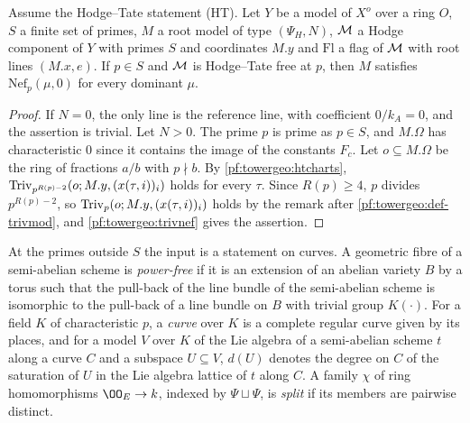 \begin{proposition}\label{pf:towergeo:rootw}
Assume the Hodge--Tate statement \textup{(HT)}. Let $Y$ be a model of $X^o$ over a ring $O$, $S$ a finite set of
primes, $M$ a root model of type $(\Psi_H,N)$, $\mathcal M$ a Hodge component of $Y$ with primes $S$ and
coordinates $M.y$ and $\mathrm{Fl}$ a flag of $\mathcal M$ with root lines $(M.x,e)$. If $p\in S$ and $\mathcal M$
is Hodge--Tate free at $p$, then $M$ satisfies $\mathrm{Nef}_p(\mu,0)$ for every dominant $\mu$.
\end{proposition}

\begin{proof}
If $N=0$, the only line is the reference line, with coefficient $0/k_A=0$, and the assertion is trivial. Let
$N>0$. The prime $p$ is prime as $p\in S$, and $M.\Omega$ has characteristic $0$ since it contains the image of the
constants $F_c$. Let $o\subseteq M.\Omega$ be the ring of fractions $a/b$ with $p\nmid b$. By
\cref{pf:towergeo:htcharts}, $\mathrm{Triv}_{p^{R(p)-2}}(o;M.y,(x(\tau,i))_i)$ holds for every $\tau$. Since
$R(p)\ge4$, $p$ divides $p^{R(p)-2}$, so $\mathrm{Triv}_p(o;M.y,(x(\tau,i))_i)$ holds by the remark after
\cref{pf:towergeo:def-trivmod}, and \cref{pf:towergeo:trivnef} gives the assertion.
\end{proof}

At the primes outside $S$ the input is a statement on curves. A geometric fibre of a semi-abelian scheme is
\emph{power-free} if it is an extension of an abelian variety $B$ by a torus such that the pull-back of the line
bundle of the semi-abelian scheme is isomorphic to the pull-back of a line bundle on $B$ with trivial group
$K(\cdot)$. For a field $K$ of characteristic $p$, a \emph{curve} over $K$ is a complete regular curve given by its
places, and for a model $V$ over $K$ of the Lie algebra of a semi-abelian scheme $t$ along a curve $C$ and a subspace
$U\subseteq V$, $d(U)$ denotes the degree on $C$ of the saturation of $U$ in the Lie algebra lattice of $t$ along
$C$. A family $\chi$ of ring homomorphisms $\OO_E\to k$, indexed by $\Psi\sqcup\Psi$, is \emph{split} if its members
are pairwise distinct.

